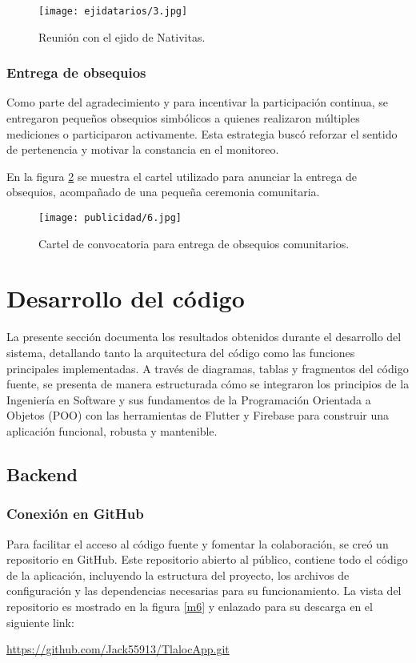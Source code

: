 \begin{figure}[H]
  \centering
  \texttt{[image: ejidatarios/3.jpg]}
  \caption{Reunión con el ejido de Nativitas.}
  \label{fig:ejido3}
\end{figure}


\subsubsection{Entrega de obsequios}

Como parte del agradecimiento y para incentivar la participación continua, se entregaron pequeños obsequios simbólicos a quienes realizaron múltiples mediciones o participaron activamente. Esta estrategia buscó reforzar el sentido de pertenencia y motivar la constancia en el monitoreo.

En la figura \ref{fig:obsequios} se muestra el cartel utilizado para anunciar la entrega de obsequios, acompañado de una pequeña ceremonia comunitaria.

\begin{figure}[H]
\centering
  \texttt{[image: publicidad/6.jpg]}
  \caption{Cartel de convocatoria para entrega de obsequios comunitarios.}
  \label{fig:obsequios}
\end{figure}




\newpage
\section{Desarrollo del código}
La presente sección documenta los resultados obtenidos durante el desarrollo del sistema, detallando tanto la arquitectura del código como las funciones principales implementadas. A través de diagramas, tablas y fragmentos del código fuente, se presenta de manera estructurada cómo se integraron los principios de la Ingeniería en Software y sus fundamentos de la Programación Orientada a Objetos (POO) con las herramientas de Flutter y Firebase para construir una aplicación funcional, robusta y mantenible.
\subsection{Backend}

\subsubsection{Conexión en GitHub}
Para facilitar el acceso al código fuente y fomentar la colaboración, se creó un repositorio en GitHub. Este repositorio abierto al público, contiene todo el código de la aplicación, incluyendo la estructura del proyecto, los archivos de configuración y las dependencias necesarias para su funcionamiento. La vista del repositorio es mostrado en la figura \ref{m6} y enlazado para su descarga en el siguiente link:
\begin{center}
  \url{https://github.com/Jack55913/TlalocApp.git}
\end{center}

